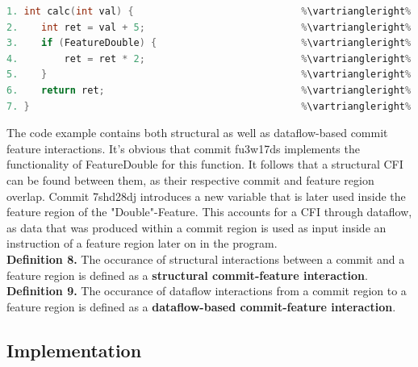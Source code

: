 \begin{lstlisting}[language=C++, caption={Commit Feature Interactions}, label=DescriptiveLabel]	
1. int calc(int val) {                             %\vartriangleright% %d93dj4gr%
2.    int ret = val + 5;                           %\vartriangleright% %7shd28dj%
3.    if (FeatureDouble) {                         %\vartriangleright% %fu3w17ds%    %\vartriangleright% %FeatureDouble%
4.        ret = ret * 2;                           %\vartriangleright% %fu3w17ds%    %\vartriangleright% %FeatureDouble%
5.    }                                            %\vartriangleright% %fu3w17ds%    %\vartriangleright% %FeatureDouble%
6.    return ret;                                  %\vartriangleright% %d93dj4gr%   
7. }                                               %\vartriangleright% %d93dj4gr%   
\end{lstlisting}
The code example contains both structural as well as dataflow-based commit feature interactions.
It's obvious that commit fu3w17ds implements the functionality of FeatureDouble for this function.
It follows that a structural CFI can be found between them, as their respective commit and feature region overlap.
Commit 7shd28dj introduces a new variable that is later used inside the feature region of the "Double"-Feature. 
This accounts for a CFI through dataflow, as data that was produced within a commit region is used as input 
inside an instruction of a feature region later on in the program. \\

\textbf{Definition 8.} The occurance of structural interactions between a commit and a feature region is defined as a \textbf{structural commit-feature interaction}. \\

\textbf{Definition 9.} The occurance of dataflow interactions from a commit region to a feature region is defined as a \textbf{dataflow-based commit-feature interaction}. 

\subsection*{Implementation}\label{ch:implementation}

